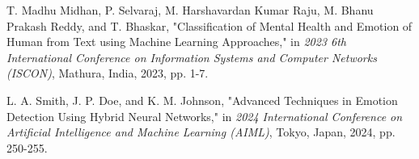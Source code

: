 \documentclass[12pt]{report}
\begin{document}
\begin{enumerate}[label={[\arabic*]}]
\item \label{conc7} T. Madhu Midhan, P. Selvaraj, M. Harshavardan Kumar Raju, M. Bhanu Prakash Reddy, and T. Bhaskar, "Classification of Mental Health and Emotion of Human from Text using Machine Learning Approaches," in \textit{2023 6th International Conference on Information Systems and Computer Networks (ISCON)}, Mathura, India, 2023, pp. 1-7. 

\item \label{conc8} L. A. Smith, J. P. Doe, and K. M. Johnson, "Advanced Techniques in Emotion Detection Using Hybrid Neural Networks," in \textit{2024 International Conference on Artificial Intelligence and Machine Learning (AIML)}, Tokyo, Japan, 2024, pp. 250-255. \end{enumerate}
\end{document}

